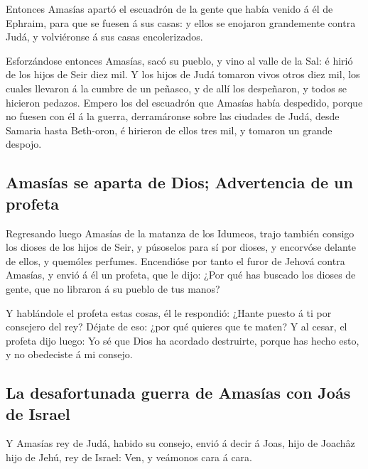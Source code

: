  Entonces Amasías apartó el escuadrón de la gente que
había venido á él de Ephraim, para que se fuesen á sus casas: y ellos se
enojaron grandemente contra Judá, y volviéronse á sus casas
encolerizados.

 Esforzándose entonces Amasías, sacó su pueblo, y vino al
valle de la Sal: é hirió de los hijos de Seir diez mil. 
Y los hijos de Judá tomaron vivos otros diez mil, los cuales llevaron á
la cumbre de un peñasco, y de allí los despeñaron, y todos se hicieron
pedazos.  Empero los del escuadrón que Amasías había
despedido, porque no fuesen con él á la guerra, derramáronse sobre las
ciudades de Judá, desde Samaria hasta Beth-oron, é hirieron de ellos
tres mil, y tomaron un grande despojo.

\hypertarget{amasuxedas-se-aparta-de-dios-advertencia-de-un-profeta}{%
\subsection{Amasías se aparta de Dios; Advertencia de un
profeta}\label{amasuxedas-se-aparta-de-dios-advertencia-de-un-profeta}}

 Regresando luego Amasías de la matanza de los Idumeos,
trajo también consigo los dioses de los hijos de Seir, y púsoselos para
sí por dioses, y encorvóse delante de ellos, y quemóles perfumes.
 Encendióse por tanto el furor de Jehová contra Amasías,
y envió á él un profeta, que le dijo: ¿Por qué has buscado los dioses de
gente, que no libraron á su pueblo de tus manos?

 Y hablándole el profeta estas cosas, él le respondió:
¿Hante puesto á ti por consejero del rey? Déjate de eso: ¿por qué
quieres que te maten? Y al cesar, el profeta dijo luego: Yo sé que Dios
ha acordado destruirte, porque has hecho esto, y no obedeciste á mi
consejo.

\hypertarget{la-desafortunada-guerra-de-amasuxedas-con-jouxe1s-de-israel}{%
\subsection{La desafortunada guerra de Amasías con Joás de
Israel}\label{la-desafortunada-guerra-de-amasuxedas-con-jouxe1s-de-israel}}

 Y Amasías rey de Judá, habido su consejo, envió á decir
á Joas, hijo de Joachâz hijo de Jehú, rey de Israel: Ven, y veámonos
cara á cara.

